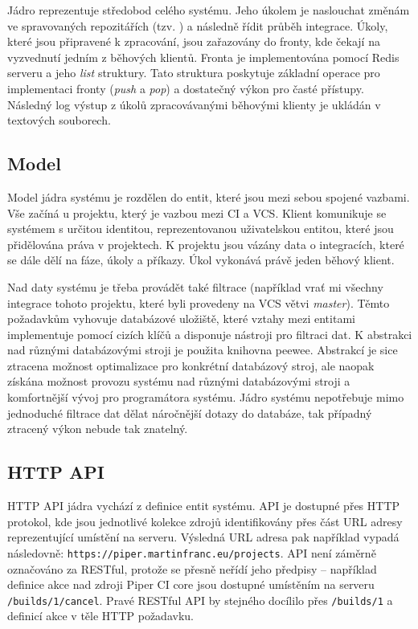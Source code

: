 Jádro reprezentuje středobod celého systému.
Jeho úkolem je naslouchat změnám ve spravovaných repozitářích (tzv. ) a následně řídit průběh integrace.
Úkoly, které jsou připravené k zpracování, jsou zařazovány do fronty, kde čekají na vyzvednutí jedním z běhových klientů.
Fronta je implementována pomocí Redis serveru a jeho \textit{list} struktury.
Tato struktura poskytuje základní operace pro implementaci fronty (\textit{push} a \textit{pop}) a dostatečný výkon pro časté přístupy.
Následný log výstup z úkolů zpracovávanými běhovými klienty je ukládán v textových souborech.

\subsection{Model}

Model jádra systému je rozdělen do entit, které jsou mezi sebou spojené vazbami.
Vše začíná u projektu, který je vazbou mezi CI a VCS.
Klient komunikuje se systémem s určitou identitou, reprezentovanou uživatelskou entitou, které jsou přidělována práva v projektech.
K projektu jsou vázány data o integracích, které se dále dělí na fáze, úkoly a příkazy.
Úkol vykonává právě jeden běhový klient.


Nad daty systému je třeba provádět také filtrace (například vrať mi všechny integrace tohoto projektu, které byli provedeny na VCS větvi \textit{master}).
Těmto požadavkům vyhovuje databázové uložiště, které vztahy mezi entitami implementuje pomocí cizích klíčů a disponuje nástroji pro filtraci dat.
K abstrakci nad různými databázovými stroji je použita knihovna peewee.
Abstrakcí je sice ztracena možnost optimalizace pro konkrétní databázový stroj, ale naopak získána možnost provozu systému nad různými databázovými stroji a komfortnější vývoj pro programátora systému.
Jádro systému nepotřebuje mimo jednoduché filtrace dat dělat náročnější dotazy do databáze, tak případný ztracený výkon nebude tak znatelný.

\subsection{HTTP API}

HTTP API jádra vychází z definice entit systému.
API je dostupné přes HTTP protokol, kde jsou jednotlivé kolekce zdrojů identifikovány přes část URL adresy reprezentující umístění na serveru.
Výsledná URL adresa pak například vypadá následovně: \verb|https://piper.martinfranc.eu/projects|.
API není záměrně označováno za RESTful, protože se přesně neřídí jeho předpisy -- například definice akce nad zdroji Piper CI core jsou dostupné umístěním na serveru \verb|/builds/1/cancel|.
Pravé RESTful API by stejného docílilo přes \verb|/builds/1| a definicí akce v těle HTTP požadavku.

